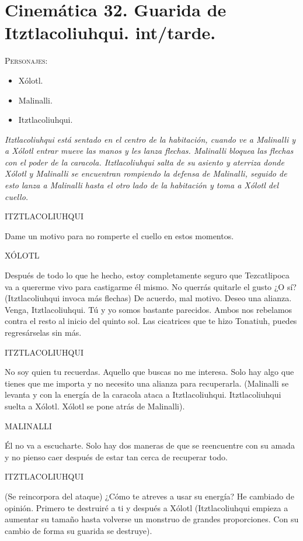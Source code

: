 \documentclass[11pt,letterpaper]{article}
\begin{document}
\section{Cinemática 32. Guarida de Itztlacoliuhqui. int/tarde.}
 \textsc{Personajes}:
 \begin{itemize}
 \item Xólotl.
 \item Malinalli.
 \item Itztlacoliuhqui.
 \end{itemize}
\textit{Itztlacoliuhqui está sentado en el centro de la habitación, cuando ve a Malinalli y a Xólotl entrar mueve las manos y les lanza flechas. Malinalli bloquea las flechas con el poder de la caracola. Itztlacoliuhqui salta de su asiento y aterriza donde Xólotl y Malinalli se encuentran rompiendo la defensa de Malinalli, seguido de esto lanza a Malinalli hasta el otro lado de la habitación y toma a Xólotl del cuello.}
\begin{center}
ITZTLACOLIUHQUI
\\
\par
Dame un motivo para no romperte el cuello en estos momentos.
\\
\par
XÓLOTL
\\
\par
Después de todo lo que he hecho, estoy completamente seguro que Tezcatlipoca va a quererme vivo para castigarme él mismo. No querrás quitarle el gusto ¿O sí?  (Itztlacoliuhqui invoca más flechas) De acuerdo, mal motivo. Deseo una alianza. Venga, Itztlacoliuhqui. Tú y yo somos bastante parecidos. Ambos nos rebelamos contra el resto al inicio del quinto sol. Las cicatrices que te hizo Tonatiuh, puedes regresárselas sin más.
\\
\par
ITZTLACOLIUHQUI
\\
\par
No soy quien tu recuerdas. Aquello que buscas no me interesa. Solo hay algo que tienes que me importa y no necesito una alianza para recuperarla. (Malinalli se levanta y con la energía de la caracola ataca a Itztlacoliuhqui. Itztlacoliuhqui suelta a Xólotl. Xólotl se pone atrás de Malinalli).
\\
\par
MALINALLI
\\
\par
Él no va a escucharte. Solo hay dos maneras de que se reencuentre con su amada y no pienso caer después de estar tan cerca de recuperar todo.
\\
\par
ITZTLACOLIUHQUI
\\
\par
(Se reincorpora del ataque) ¿Cómo te atreves a usar su energía? He cambiado de opinión. Primero te destruiré a ti y después a Xólotl (Itztlacoliuhqui empieza a aumentar su tamaño hasta volverse un monstruo de grandes proporciones. Con su cambio de forma su guarida se destruye).
\end{center}
\end{document}
